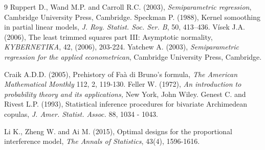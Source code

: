 \documentclass[twoside]{article}
\begin{document}
\begin{thebibliography}{9}
 Ruppert D., Wand M.P. and Carroll R.C. (2003), {\it Semiparametric regression}, Cambridge University Press, Cambridge.
 Speckman P. (1988), Kernel somoothing in partial linear models, {\it J. Roy. Statist. Soc. Ser. B}, 50, 413–436.
  V\'{i}sek J.A. (2006), The least trimmed squares part III: Asymptotic normality, {\it KYBERNETIKA}, {42}, (2006),  203-224.
 Yatchew A. (2003), {\it Semiparametric regression for the applied econometrican}, Cambridge
            University Press, Cambridge.
            



    
    
Craik A.D.D. (2005), Prehistory of Fa\`{a} di Bruno's formula, {\it The American Mathematical Monthly} 112, 2,  119-130.
Feller W. (1972), {\it An introduction to probability theory and its applications,} New York, John Wiley.
Genest C. and  Rivest L.P. (1993), Statistical inference
procedures for bivariate Archimedean copulas, {\it J. Amer.
Statist. Assoc.} 88,  1034 - 1043.

Li K., Zheng W. and Ai M. (2015), Optimal designs for the proportional interference model, {\it The Annals of Statistics}, 43(4), 1596-1616.
\end{thebibliography}
 
\end{document}
